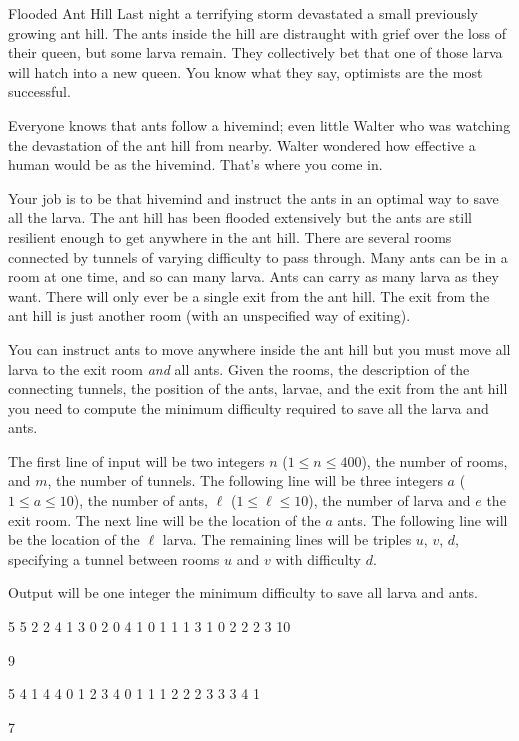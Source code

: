 \begin{problem}{Flooded Ant Hill}
Last night a terrifying storm devastated a small previously growing ant hill.
The ants inside the hill are distraught with grief over the loss of their queen, but some larva remain.
They collectively bet that one of those larva will hatch into a new queen.
You know what they say, optimists are the most successful.

Everyone knows that ants follow a hivemind; even little Walter who was watching the devastation of the ant hill from nearby.
Walter wondered how effective a human would be as the hivemind.
That's where you come in.

Your job is to be that hivemind and instruct the ants in an optimal way to save all the larva.
The ant hill has been flooded extensively but the ants are still resilient enough to get anywhere in the ant hill.
There are several rooms connected by tunnels of varying difficulty to pass through.
Many ants can be in a room at one time, and so can many larva.
Ants can carry as many larva as they want.
There will only ever be a single exit from the ant hill.
The exit from the ant hill is just another room (with an unspecified way of exiting).

You can instruct ants to move anywhere inside the ant hill but you must move all larva to the exit room \textit{and} all ants.
Given the rooms, the description of the connecting tunnels, the position of the ants, larvae, and the exit from the ant hill you need to compute the minimum difficulty required to save all the larva and ants.
\end{problem}

\begin{formalin}
The first line of input will be two integers $n$ ($1 \leq n \leq 400$), the number of rooms, and $m$, the number of tunnels.
The following line will be three integers $a$ ($1 \leq a \leq 10$), the number of ants, $\ell$ ($1 \leq \ell \leq 10$), the number of larva and $e$ the exit room.
The next line will be the location of the $a$ ants.
The following line will be the location of the $\ell$ larva.
The remaining lines will be triples $u$, $v$, $d$, specifying a tunnel between rooms $u$ and $v$ with difficulty $d$.
\end{formalin}

\begin{formalout}
Output will be one integer the minimum difficulty to save all larva and ants.
\end{formalout}

\begin{datain}
5 5
2 2 4
1 3
0 2
0 4 1
0 1 1
1 3 1
0 2 2
2 3 10
\end{datain}
\begin{dataout}
9
\end{dataout}
\begin{datain}
5 4
1 4 4
0
1 2 3 4
0 1 1
1 2 2
2 3 3
3 4 1
\end{datain}
\begin{dataout}
7
\end{dataout}
